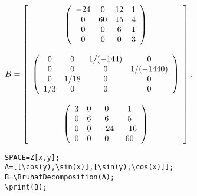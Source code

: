 {$B = \left[\begin{array}{c}
\left(\begin{array}{cccc}-24& 0&  12& 1\\
 0&   60& 15& 4\\
 0&   0&  6&  1\\
 0&   0&  0&  3\\ 
\end{array}\right) \\ 
\null \\
\left(\begin{array}{cccc}0&     0&      1/(-144)& 0          \\
 0&     0&      0&          1/(-1440)\\
 0&     1/18& 0&          0          \\
 1/3& 0&      0&          0          \\ 
\end{array}\right) \\ 
\null \\
\left(\begin{array}{cccc}3& 0& 0&   1  \\
 0& 6& 6&   5  \\
 0& 0& -24& -16\\
 0& 0& 0&   60 \\ 
\end{array}\right) \\ 
 \end{array}\right].$
} 

\begin{verbatim}
SPACE=Z[x,y];
A=[[\cos(y),\sin(x)],[\sin(y),\cos(x)]];
B=\BruhatDecomposition(A);
\print(B);
\end{verbatim}

